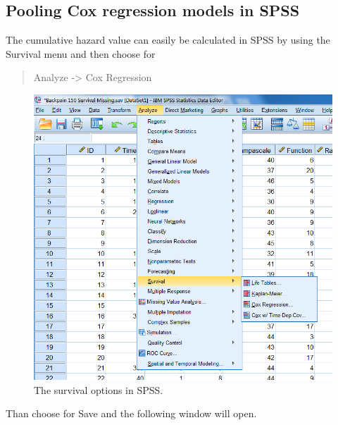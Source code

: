 \documentclass[]{book}
\begin{document}
\subsection{Pooling Cox regression models in
SPSS}\label{pooling-cox-regression-models-in-spss}

The cumulative hazard value can easily be calculated in SPSS by using
the Survival menu and then choose for

\begin{quote}
Analyze -\textgreater{} Cox Regression
\end{quote}

\begin{figure}

{\centering \includegraphics[width=0.9\linewidth]{images/fig5.5} 

}

\caption{The survival options in SPSS.}\label{fig:fig5-5}
\end{figure}

Than choose for Save and the following window will open.
\end{document}

